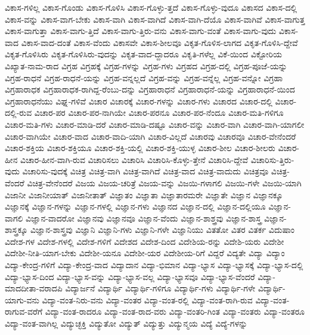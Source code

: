 {ವಿಕಾಸ-ಗಳಿಲ್ಲ
ವಿಕಾಸ-ಗೊಂಡು
ವಿಕಾಸ-ಗೊಳಿಸಿ
ವಿಕಾಸ-ಗೊಳ್ಳು-ತ್ತದೆ
ವಿಕಾಸ-ಗೊಳ್ಳು-ವುದೂ
ವಿಕಾಸದ
ವಿಕಾಸ-ದಲ್ಲಿ
ವಿಕಾಸ-ವನ್ನು
ವಿಕಾಸ-ವಾಗ-ಬೇಕು
ವಿಕಾಸ-ವಾಗಿ
ವಿಕಾಸ-ವಾಗಿದೆ
ವಿಕಾಸ-ವಾಗಿ-ದೆಯೊ
ವಿಕಾಸ-ವಾಗಿವೆ
ವಿಕಾಸ-ವಾಗುತ್ತ
ವಿಕಾಸ-ವಾಗುತ್ತಾ
ವಿಕಾಸ-ವಾಗು-ತ್ತಿದೆ
ವಿಕಾಸ-ವಾಗು-ತ್ತಿರು-ವನು
ವಿಕಾಸ-ವಾಗು-ವಂತೆ
ವಿಕಾಸ-ವಾಗು-ವುದು
ವಿಕಾಸ-ವಾದ
ವಿಕಾಸ-ವಾದ-ದಂತೆ
ವಿಕಾಸ-ವೆಂದು
ವಿಕಾಸವೇ
ವಿಕಾಸ-ಶೀಲವೂ
ವಿಕೃತ-ಗೊಳಿಸ-ಲಾಗದ
ವಿಕೃತ-ಗೊಳಿಸಿ-ದ್ದೇವೆ
ವಿಕೃತ-ಗೊಳಿಸಿರು
ವಿಕೃತ-ಗೊಳಿಸಿರು-ವುದನ್ನು
ವಿಕೃತ-ವಾದ-ದ್ದಾದರೂ
ವಿಕೃತಿ-ಗಳೆಲ್ಲ
ವಿಕೆ-ಯಿಂದ
ವಿಕ್ಟೋರಿಯ
ವಿಖ್ಯಾತ-ನಾಮ-ರಾದ
ವಿಗ್ರಹ
ವಿಗ್ರಹಕ್ಕೆ
ವಿಗ್ರಹ-ಗಳನ್ನು
ವಿಗ್ರಹ-ಗಳು
ವಿಗ್ರಹದ
ವಿಗ್ರಹ-ದಲ್ಲಿ
ವಿಗ್ರಹ-ಪೂಜೆ-ಯನ್ನು
ವಿಗ್ರಹ-ರಾಧನೆ
ವಿಗ್ರಹ-ರಾಧನೆ-ಯನ್ನು
ವಿಗ್ರಹ-ವನ್ನಲ್ಲದೆ
ವಿಗ್ರಹ-ವನ್ನು
ವಿಗ್ರಹ-ವನ್ನೆಲ್ಲ
ವಿಗ್ರಹ-ವನ್ನೋ
ವಿಗ್ರಹಾ
ವಿಗ್ರಹಾರಾಧಕ
ವಿಗ್ರಹಾರಾಧಕ-ರಾಗಿದ್ದ-ರೆಂಬು-ದನ್ನು
ವಿಗ್ರಹಾರಾಧನೆ
ವಿಗ್ರಹಾರಾಧನೆ-ಯನ್ನು
ವಿಗ್ರಹಾರಾಧನೆ-ಯಿಂದ
ವಿಗ್ರಹಾರಾಧನೆಯು
ವಿಘ್ನ-ಗಳಿವೆ
ವಿಚಾರ
ವಿಚಾರಕ್ಕೆ
ವಿಚಾರ-ಗಳನ್ನು
ವಿಚಾರ-ಗಳು
ವಿಚಾರದ
ವಿಚಾರ-ದಲ್ಲಿ
ವಿಚಾರ-ದಲ್ಲಿ-ರುವ
ವಿಚಾರ-ಪರ
ವಿಚಾರ-ಪರ-ನಾಗಿಯೇ
ವಿಚಾರ-ಪರನೂ
ವಿಚಾರ-ಪರ-ನೆಂದೂ
ವಿಚಾರ-ಮತಿ-ಗಳಿಗೂ
ವಿಚಾರ-ಮತಿ-ಗಳು
ವಿಚಾರ-ಮಾಡಿ-ದರೆ
ವಿಚಾರ-ಮಾಡಿ-ದಷ್ಟೂ
ವಿಚಾರ-ವನ್ನು
ವಿಚಾರ-ವಾಗಿ
ವಿಚಾರ-ವಾಗಿ-ಯಾಗಲೀ
ವಿಚಾರ-ವಾಗಿಯೇ
ವಿಚಾರ-ವಾದ
ವಿಚಾರ-ವಾದಿ-ಯಾಗಿ
ವಿಚಾರ-ವಿಲ್ಲದೆ
ವಿಚಾರವು
ವಿಚಾರವೂ
ವಿಚಾರ-ವೇನೆಂದರೆ
ವಿಚಾರ-ಶಕ್ತಿಯ
ವಿಚಾರ-ಶಕ್ತಿಯೂ
ವಿಚಾರ-ಶಕ್ತಿ-ಯಲ್ಲಿ
ವಿಚಾರ-ಶಕ್ತಿ-ಯುಳ್ಳ
ವಿಚಾರ-ಶೀಲ
ವಿಚಾರ-ಶೀಲರು
ವಿಚಾರ-ಹೀನ
ವಿಚಾರ-ಹೀನ-ವಾಗಿ-ರುವ
ವಿಚಾರಿಸಲು
ವಿಚಾರಿಸಿ
ವಿಚಾರಿಸಿ-ಕೊಳ್ಳು-ತ್ತೇನೆ
ವಿಚಾರಿಸಿ-ದ್ದೇವೆ
ವಿಚಾರಿಸು-ತ್ತಿರು-ವುದು
ವಿಚಾರಿಸು-ವುದಕ್ಕೆ
ವಿಚಿತ್ರ
ವಿಚಿತ್ರ-ವಾಗಿ
ವಿಚಿತ್ರ-ವಾಗಿದೆ
ವಿಚಿತ್ರ-ವಾದ
ವಿಚಿತ್ರ-ವಾದುದು
ವಿಚಿತ್ರವೂ
ವಿಚಿತ್ರ-ವೆಂದರೆ
ವಿಚಿತ್ರ-ವೇನೆಂದರೆ
ವಿಜಯ
ವಿಜಯ-ಚರಿತ್ರೆ
ವಿಜಯ-ವನ್ನು
ವಿಜಯಿ-ಗಳಾಗಲಿ
ವಿಜಯಿ-ಗಳೇ
ವಿಜಯಿ-ಯಾಗಿ
ವಿಜಾನೀ
ವಿಜಾನೀಯಾತ್
ವಿಜಾನೀತಾತ್
ವಿಜ್ಞಾತಂ
ವಿಜ್ಞಾತಾ
ವಿಜ್ಞಾತಾರಮರೇ
ವಿಜ್ಞಾತೇ
ವಿಜ್ಞಾನ
ವಿಜ್ಞಾನಕ್ಕೂ
ವಿಜ್ಞಾನಕ್ಕೆ
ವಿಜ್ಞಾನ-ಗಳನ್ನು
ವಿಜ್ಞಾನ-ಗಳಲ್ಲಿ
ವಿಜ್ಞಾನ-ಗಳು
ವಿಜ್ಞಾನದ
ವಿಜ್ಞಾನ-ದಲ್ಲಿ
ವಿಜ್ಞಾನ-ದಲ್ಲಿಯೂ
ವಿಜ್ಞಾನ-ವಾಗಲಿ
ವಿಜ್ಞಾನ-ವಾದರೋ
ವಿಜ್ಞಾನವು
ವಿಜ್ಞಾನವೂ
ವಿಜ್ಞಾನ-ವೆಂದು
ವಿಜ್ಞಾನ-ಶಾಶ್ತ್ರವು
ವಿಜ್ಞಾನ-ಶಾಸ್ತ್ರ
ವಿಜ್ಞಾನ-ಶಾಸ್ತ್ರಕ್ಕೂ
ವಿಜ್ಞಾನ-ಶಾಸ್ತ್ರವು
ವಿಜ್ಞಾನಿ
ವಿಜ್ಞಾನಿ-ಗಳು
ವಿಜ್ಞಾನಿ-ಗಳೇ
ವಿಜ್ಞಾನಿಯು
ವಿತತೋ
ವಿತರ
ವಿತರ್ಕ
ವಿದುಷಾಂ
ವಿದೇಶ-ಗಳ
ವಿದೇಶ-ಗಳಲ್ಲಿ
ವಿದೇಶ-ಗಳಿಗೆ
ವಿದೇಶದ
ವಿದೇಶ-ದಿಂದ
ವಿದೇಶಿಯ-ರನ್ನು
ವಿದೇಶಿ-ಯರು
ವಿದೇಶೀ
ವಿದೇಶೀ-ನೀತಿ-ಯಾಗ-ಬೇಕು
ವಿದೇಶೀ-ಯನೂ
ವಿದೇಶೀ-ಯರ
ವಿದೇಶೀಯ-ರಿಗೆ
ವಿದ್ದರೆ
ವಿದ್ಯತೇ
ವಿದ್ಯಾ
ವಿದ್ಯಾಂ
ವಿದ್ಯಾ-ಕೇಂದ್ರ-ಗಳಿಗೆ
ವಿದ್ಯಾ-ಕೇಂದ್ರ-ವಾದ
ವಿದ್ಯಾದಾನ
ವಿದ್ಯಾ-ಭಿಮಾನ
ವಿದ್ಯಾ-ಭ್ಯಾಸ
ವಿದ್ಯಾ-ಭ್ಯಾಸಕ್ಕೆ
ವಿದ್ಯಾ-ಭ್ಯಾಸ-ದಲ್ಲಿ
ವಿದ್ಯಾ-ಭ್ಯಾಸ-ದಿಂದ
ವಿದ್ಯಾ-ಭ್ಯಾಸ-ವನ್ನು
ವಿದ್ಯಾ-ಭ್ಯಾಸ-ವಲ್ಲ
ವಿದ್ಯಾ-ಭ್ಯಾಸವೂ
ವಿದ್ಯಾ-ಭ್ಯಾಸ-ವೆಂದರೆ
ವಿದ್ಯಾ-ಮಾದದೀತಾ-ವರಾದಪಿ
ವಿದ್ಯಾರ್ಜನೆ
ವಿದ್ಯಾರ್ಥಿ
ವಿದ್ಯಾರ್ಥಿ-ಗಳಿಗೂ
ವಿದ್ಯಾರ್ಥಿ-ಗಳು
ವಿದ್ಯಾರ್ಥಿ-ಗಳೇ
ವಿದ್ಯಾರ್ಥಿ-ಯಾಗು-ವನು
ವಿದ್ಯಾ-ವಂತ-ನಿರು-ವನು
ವಿದ್ಯಾ-ವಂತರ
ವಿದ್ಯಾ-ವಂತ-ರಲ್ಲಿ
ವಿದ್ಯಾ-ವಂತ-ರಾಗಿ-ರುವ
ವಿದ್ಯಾ-ವಂತ-ರಾಗುವ-ವರೆಗೆ
ವಿದ್ಯಾ-ವಂತ-ರಾದರೂ
ವಿದ್ಯಾ-ವಂತ-ರಾದ-ವರು
ವಿದ್ಯಾ-ವಂತರಿ-ಗಿಂತ
ವಿದ್ಯಾ-ವಂತರು
ವಿದ್ಯಾ-ವಂತರೂ
ವಿದ್ಯಾ-ವಂತ-ವಾಗಿಲ್ಲ
ವಿದ್ಯುಚ್ಛಕ್ತಿ
ವಿದ್ಯುತೋ
ವಿದ್ಯುತ್
ವಿದ್ಯುತ್ತು
ವಿದ್ಯುನ್ಮಯ
ವಿದ್ಯೆ
ವಿದ್ಯೆ-ಗಳನ್ನು
}
